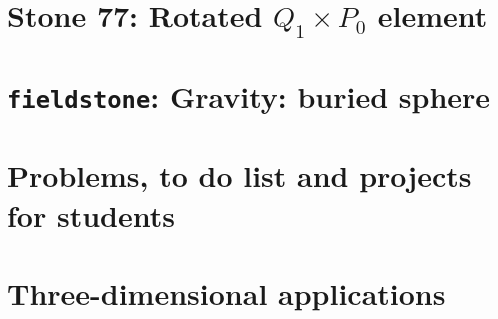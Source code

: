 \documentclass[a4paper]{article}
\numberwithin{equation}{section}
\begin{document}
\section*{
Stone 77: Rotated $Q_1\times P_0$ element
\label{f77}}





































\newpage %
\section{{\tt fieldstone}: Gravity: buried sphere} %

\newpage %
\section{Problems, to do list and projects for students} %

\appendix %

\newpage %
\section{Three-dimensional applications}  %
\newpage %
\end{document}

